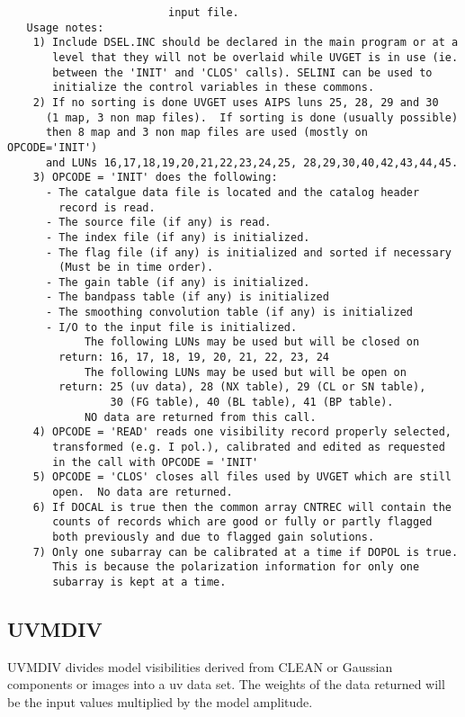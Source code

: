 \begin{verbatim}
                         input file.
   Usage notes:
    1) Include DSEL.INC should be declared in the main program or at a
       level that they will not be overlaid while UVGET is in use (ie.
       between the 'INIT' and 'CLOS' calls). SELINI can be used to
       initialize the control variables in these commons.
    2) If no sorting is done UVGET uses AIPS luns 25, 28, 29 and 30
      (1 map, 3 non map files).  If sorting is done (usually possible)
      then 8 map and 3 non map files are used (mostly on OPCODE='INIT')
      and LUNs 16,17,18,19,20,21,22,23,24,25, 28,29,30,40,42,43,44,45.
    3) OPCODE = 'INIT' does the following:
      - The catalgue data file is located and the catalog header
        record is read.
      - The source file (if any) is read.
      - The index file (if any) is initialized.
      - The flag file (if any) is initialized and sorted if necessary
        (Must be in time order).
      - The gain table (if any) is initialized.
      - The bandpass table (if any) is initialized
      - The smoothing convolution table (if any) is initialized
      - I/O to the input file is initialized.
            The following LUNs may be used but will be closed on
        return: 16, 17, 18, 19, 20, 21, 22, 23, 24
            The following LUNs may be used but will be open on
        return: 25 (uv data), 28 (NX table), 29 (CL or SN table),
                30 (FG table), 40 (BL table), 41 (BP table).
            NO data are returned from this call.
    4) OPCODE = 'READ' reads one visibility record properly selected,
       transformed (e.g. I pol.), calibrated and edited as requested
       in the call with OPCODE = 'INIT'
    5) OPCODE = 'CLOS' closes all files used by UVGET which are still
       open.  No data are returned.
    6) If DOCAL is true then the common array CNTREC will contain the
       counts of records which are good or fully or partly flagged
       both previously and due to flagged gain solutions.
    7) Only one subarray can be calibrated at a time if DOPOL is true.
       This is because the polarization information for only one
       subarray is kept at a time.
\end{verbatim}

\subsection{UVMDIV}
UVMDIV divides model visibilities derived from CLEAN or Gaussian
components or images into a uv data set.  The weights of the data
returned will be the input values multiplied by the model amplitude.

